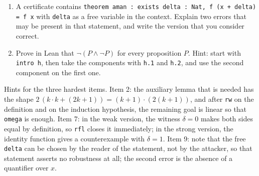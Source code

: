 \begin{latihan}
\begin{enumerate}
  \item A certificate contains \texttt{theorem aman : exists delta : Nat, f (x + delta) = f x} with
        \texttt{delta} as a free variable in the context. Explain two errors that may be present in
        that statement, and write the version that you consider correct.

  \item Prove in Lean that $\neg(P\wedge\neg P)$ for every proposition $P$. Hint: start with
        \texttt{intro h}, then take the components with \texttt{h.1} and \texttt{h.2}, and use the
        second component on the first one.
\end{enumerate}

Hints for the three hardest items. Item 2: the auxiliary lemma that is needed has the shape
$2\,(k\cdot k+(2k+1))=(k+1)\cdot(2(k+1))$, and after \texttt{rw} on the definition and on the
induction hypothesis, the remaining goal is linear so that \texttt{omega} is enough. Item 7: in the
weak version, the witness $\delta=0$ makes both sides equal by definition, so \texttt{rfl} closes it
immediately; in the strong version, the identity function gives a counterexample with $\delta=1$.
Item 9: note that the free \texttt{delta} can be chosen by the reader of the statement, not by the
attacker, so that statement asserts no robustness at all; the second error is the absence of a
quantifier over $x$.
\end{latihan}

